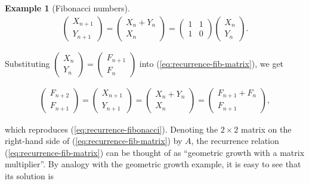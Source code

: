 \documentclass[11pt]{report}
\theoremstyle{plain}
\theoremstyle{definition}
\newtheorem{example}[thm]{Example}
\begin{document}
\begin{example}[Fibonacci numbers]
\begin{equation*} \tag{33}\label{eq:recurrence-fib-matrix}
\begin{split}
\left( \begin{array}{c}X_{n+1}\\Y_{n+1}\end{array}\right) =
\left( \begin{array}{c} X_n+Y_n \\ X_n
\end{array}\right) =
\left( \begin{array}{cc}
1&1\\1&0
\end{array}\right)
\left( \begin{array}{c}X_n\\Y_n\end{array}\right).
\end{split}
\end{equation*}

Substituting
$\left(
\begin{array}{c}X_n\\Y_n\end{array}\right)=\left(
\begin{array}{c}F_{n+1}\\F_n\end{array}\right)$
into (\ref{eq:recurrence-fib-matrix}), we get

\begin{align*}
\left( \begin{array}{c}F_{n+2}\\F_{n+1}\end{array}\right)
=
\left( \begin{array}{c} X_{n+1}\\ Y_{n+1}
\end{array}\right) =
\left( \begin{array}{c} X_n+Y_n \\ X_n
\end{array}\right) =
\left( \begin{array}{c} F_{n+1}+F_n \\ F_{n+1}
\end{array}\right),
\end{align*}

which reproduces (\ref{eq:recurrence-fibonacci}).
Denoting the $2\times 2$ matrix on the right-hand
side of (\ref{eq:recurrence-fib-matrix}) by $A$, the
recurrence relation (\ref{eq:recurrence-fib-matrix}) can
be thought of as ``geometric growth with a matrix
multiplier''. By analogy with the geometric growth
example, it is easy to see that its solution is


\end{example}
\end{document}
